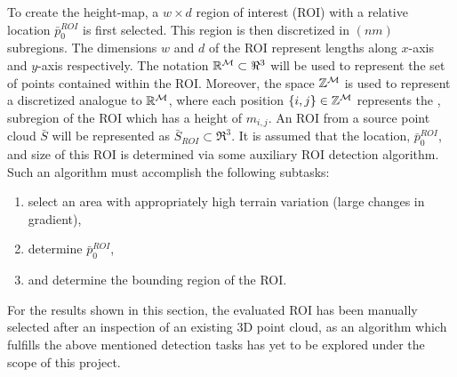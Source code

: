 			To create the height-map, a $w\times d$ region of interest (ROI) with a relative location $\bar{p}_{0}^{ROI}$ is first selected. This region is then discretized in $(nm)$ subregions. The dimensions $w$ and $d$ of the ROI represent lengths along $x$-axis and $y$-axis respectively. The notation ${\Bbb R}^{{\cal M}}\subset \Re^{3}$ will be used to represent the set of points contained within the ROI.  Moreover, the space ${\Bbb Z}^{{\cal M}}$ is used to represent a discretized analogue to ${\Bbb R}^{{\cal M}}$, where each position $\{i,j\}\in{\Bbb Z}^{{\cal M}}$ represents the \Ith, \Jth subregion of the ROI which has a height of $m_{i,j}$. An ROI from a source point cloud $\bar{S}$ will be represented as $\bar{S}_{ROI}\subset\Re^{3}$. It is assumed that the location, $\bar{p}_{0}^{ROI}$, and size of this ROI is determined via some auxiliary ROI detection algorithm. Such an algorithm must accomplish the following subtasks:
			\begin{enumerate}
				\item select an area with appropriately high terrain variation (large changes in gradient),
				\item determine $\bar{p}_{0}^{ROI}$,
				\item and determine the bounding region of the ROI.
			\end{enumerate}
			For the results shown in this section, the evaluated ROI has been manually selected after an inspection of an existing 3D point cloud, as an algorithm which fulfills the above mentioned detection tasks has yet to be explored under the scope of this project. %

